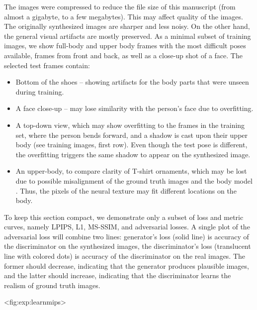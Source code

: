 The images were compressed to reduce the file size of this manuscript (from almost a gigabyte, to a few megabytes). This may affect quality of the images. The originally synthesized images are sharper and less noisy. On the other hand, the general visual artifacts are mostly preserved. As a minimal subset of training images, we show full-body and upper body frames with the most difficult poses available, frames from front and back, as well as a close-up shot of a face. The selected test frames contain:
\begin{itemize}
	\item Bottom of the shoes -- showing artifacts for the body parts that were unseen during training.
	\item A face close-up -- may lose similarity with the person's face due to overfitting.
	\item A top-down view, which may show overfitting to the frames in the training set, where the person bends forward, and a shadow is cast upon their upper body (see training images, first row). Even though the test pose is different, the overfitting triggers the same shadow to appear on the synthesized image.
	\item An upper-body, to compare clarity of T-shirt ornaments, which may be lost due to possible misalignment of the ground truth images and the body model \cite{dnn:smplx19}. Thus, the pixels of the neural texture may fit different locations on the body.
\end{itemize}

To keep this section compact, we demonstrate only a subset of loss and metric curves, namely LPIPS, L1, MS-SSIM, and adversarial losses. A single plot of the adversarial loss will combine two lines: generator's loss (solid line) is accuracy of the discriminator on the synthesized images, the discriminator's loss (translucent line with colored dots) is accuracy of the discriminator on the real images. The former should decrease, indicating that the generator produces plausible images, and the latter should increase, indicating that the discriminator learns the realism of ground truth images.

\setcounter{experiments-counter}{1}

<fig:exp:learnmips>


